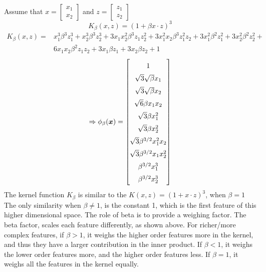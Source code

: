 \documentclass[11pt]{article}
\newcommand{\solution}[1]{{{\color{blue}{\bf Solution:} {#1}}}}
\begin{document}
\solution{} \newline
Assume that $x = \begin{bmatrix}
x_1 \\
x_2
\end{bmatrix}
$ and $ z = \begin{bmatrix}
z_1 \\
z_2
\end{bmatrix}
$
$$
K_\beta (x, z) = (1 + \beta x \cdot z)^3
$$
\begin{align*}
K_\beta (x, z) = & x_1^3 \beta^3 z_1^3 + x_2^3 \beta^3 z_2^3 + 3 x_1 x_2^2 \beta^3 z_1 z_2^2 + 3 x_1^2 x_2 \beta^3 z_1^2 z_2 + 3 x_1^2 \beta^2 z_1^2 + 3 x_2^2 \beta^2 z_2^2 + \\ 
&  6 x_1 x_2 \beta^2 z_1 z_2 + 3 x_1 \beta z_1 + 3 x_2 \beta z_2 + 1
\end{align*}
$$
\Rightarrow \phi_{\beta}(\boldsymbol{x}) = 
\begingroup
\renewcommand*{\arraystretch}{1.5}
\begin{bmatrix}
1 \\
\sqrt{3}\sqrt{\beta}x_1 \\ 
\sqrt{3}\sqrt{\beta}x_2 \\
\sqrt{6} \beta x_1 x_2 \\
\sqrt{3} \beta x_1^2 \\
\sqrt{3} \beta x_2^2 \\
\sqrt{3}\beta^{3/2} x_1^2 x_2 \\
\sqrt{3}\beta^{3/2} x_1 x_2^2 \\
\beta^{3/2}x_1^3 \\
\beta^{3/2}x_2^3 \\
\end{bmatrix}
\endgroup
$$
The kernel function $K_{\beta}$ is similar to the $K(x,z) = (1 + x\cdot z)^3$, when $\beta=1$
The only similarity when $\beta \neq 1$, is the constant 1, which is the first feature of this
higher dimensional space. \newline
The role of beta is to provide a weighing factor. The beta factor, scales each feature differently,
as shown above. For richer/more complex features, if $\beta > 1$, it weighs the higher order
features more in the kernel, and thus they have a larger contribution in the inner product.
If $\beta < 1$, it weighs the lower order features more, and the higher order features less.
If $\beta = 1$, it weighs all the features in the kernel equally. 

\newpage
\end{document}
